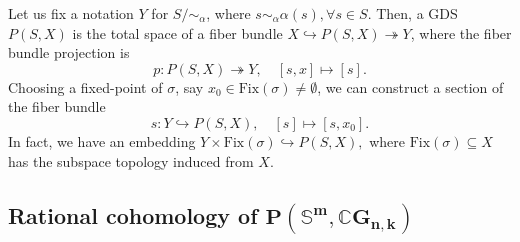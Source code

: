 \documentclass{amsart}
\begin{document}
	Let us fix a notation $ Y $ for $ S/\!\!\sim_{\alpha} $, where $ s\sim_{\alpha} \alpha(s), \forall s\in S $. Then, a GDS $ P(S,X) $ is the total space of a fiber bundle  
	$X\hookrightarrow P(S,X) \twoheadrightarrow Y $, where the fiber bundle projection is \begin{equation}\label{proj}
		p: P(S,X) \twoheadrightarrow Y, \quad [s,x]\mapsto [s].
	\end{equation}  Choosing a fixed-point of $\sigma$, say $x_0\in \text{Fix}(\sigma)\neq \emptyset$, we can construct a section of the fiber bundle \begin{equation}\label{sectio}
		s: Y \hookrightarrow P(S,X), \quad [s]\mapsto [s,x_0].
	\end{equation}    
	In fact, we have an embedding  
	$Y\times \text{Fix}(\sigma)\hookrightarrow P(S,X),$  
	where $ \text{Fix}(\sigma) \subseteq X $ has the subspace topology induced from $ X $.
	
	
	
	
	
	
	\subsection{Rational cohomology of $\mathbf{P(\mathbb S^m,\mathbb CG_{n,k})}$} \label{gds}
	
\end{document}
